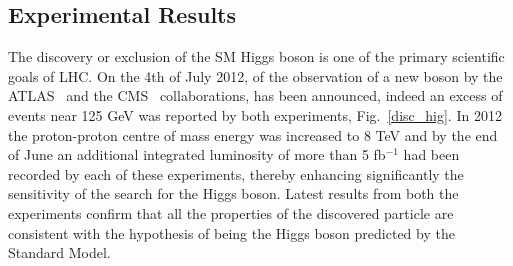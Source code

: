 \subsection*{Experimental Results}
The discovery or exclusion of the SM Higgs boson is one of the primary scientific goals of LHC. On the 4th of July 2012, of the observation of a new boson by the ATLAS~\cite{Aad:2012tfa} and the CMS~\cite{Chatrchyan:2012xdj} collaborations, has been announced, indeed an excess of events near 125 GeV was reported by both experiments, Fig.~\ref{disc_hig}. In 2012 the proton-proton centre of mass energy was increased to 8 TeV and by the end of June an additional integrated luminosity
of more than 5 fb$^{-1}$
had been recorded by each of these experiments, thereby enhancing significantly the sensitivity of the search for the Higgs boson.
Latest results from both the experiments confirm
that all the properties of the discovered particle are consistent with the hypothesis of
being the Higgs boson predicted by the Standard Model.
